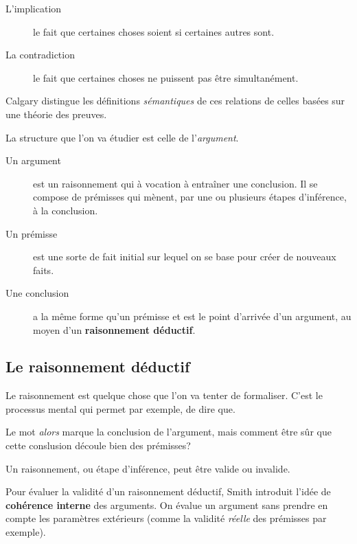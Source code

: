 \documentclass[fleqn,a4paper,nobib]{tufte-handout}
\begin{document}
\begin{description}
    \item[L'implication] le fait que certaines choses soient si certaines autres sont.
    \item[La contradiction] le fait que certaines choses ne puissent pas être simultanément.
\end{description}

Calgary distingue les définitions \emph{sémantiques} de ces
relations de celles basées sur une théorie des preuves.

La structure que l'on va étudier est celle de l'\textit{argument}.

\begin{description}
    \item[Un argument] est un raisonnement qui à vocation à entraîner une conclusion.
    Il se compose de prémisses qui mènent, par une ou plusieurs étapes d'inférence, à
    la conclusion.
    \item[Un prémisse] est une sorte de fait initial sur lequel on se base pour
    créer de nouveaux faits.
    \item[Une conclusion] a la même forme qu'un prémisse et est le point d'arrivée
    d'un argument, au moyen d'un \textbf{raisonnement déductif}.
\end{description}

\subsection{Le raisonnement déductif}

Le raisonnement est quelque chose que l'on va tenter de formaliser. C'est
le processus mental qui permet par exemple, de dire que.

Le mot \textit{alors} marque la conclusion de l'argument, mais comment être sûr
que cette conslusion découle bien des prémisses?

Un raisonnement, ou étape d'inférence, peut être valide ou invalide.

Pour évaluer la validité d'un raisonnement déductif, Smith introduit l'idée de
\textbf{cohérence interne} des arguments. On évalue un argument sans prendre
en compte les paramètres extérieurs (comme la validité \emph{réelle} des prémisses
par exemple).
\end{document}

